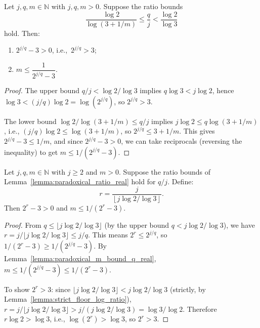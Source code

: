 \begin{lemma}\label{lemma:paradoxical_m_bound_q_real}\leanok
Let $j, q, m \in \mathbb{N}$ with $j, q, m > 0$. Suppose the ratio bounds
\begin{equation}
    \frac{\log 2}{\log(3 + 1/m)} \le \frac{q}{j} < \frac{\log 2}{\log 3}
\end{equation}
hold. Then:
\begin{enumerate}
    \item $2^{j/q} - 3 > 0$, i.e.,\  $2^{j/q} > 3$;
    \item $m \le \dfrac{1}{2^{j/q} - 3}$.
\end{enumerate}
\end{lemma}
\begin{proof}\leanok
The upper bound $q/j < \log 2 / \log 3$ implies $q \log 3 < j \log 2$, hence $\log 3 < (j/q) \log 2 = \log(2^{j/q})$, so $2^{j/q} > 3$.

The lower bound $\log 2 / \log(3+1/m) \le q/j$ implies $j \log 2 \le q \log(3+1/m)$, i.e., $(j/q)\log 2 \le \log(3+1/m)$, so $2^{j/q} \le 3 + 1/m$. This gives $2^{j/q} - 3 \le 1/m$, and since $2^{j/q} - 3 > 0$, we can take reciprocals (reversing the inequality) to get $m \le 1/(2^{j/q} - 3)$.
\end{proof}

\begin{lemma}\label{lemma:paradoxical_m_bound_floor_real}\leanok
Let $j, q, m \in \mathbb{N}$ with $j \ge 2$ and $m > 0$. Suppose the ratio bounds of Lemma~\ref{lemma:paradoxical_ratio_real} hold for $q/j$. Define:
\begin{equation}
    r = \frac{j}{\left\lfloor j \log 2 / \log 3 \right\rfloor}.
\end{equation}
Then $2^r - 3 > 0$ and $m \le 1/(2^r - 3)$.
\end{lemma}
\begin{proof}\leanok
From $q \le \lfloor j \log 2/\log 3 \rfloor$ (by the upper bound $q < j \log 2/\log 3$), we have $r = j/\lfloor j \log 2/\log 3 \rfloor \le j/q$.
This means $2^r \le 2^{j/q}$, so $1/(2^r - 3) \ge 1/(2^{j/q} - 3)$.
By Lemma~\ref{lemma:paradoxical_m_bound_q_real}, $m \le 1/(2^{j/q}-3) \le 1/(2^r - 3)$.

To show $2^r > 3$: since $\lfloor j\log 2/\log 3 \rfloor < j \log 2/\log 3$ (strictly, by Lemma~\ref{lemma:strict_floor_log_ratio}), $r = j/\lfloor j\log 2/\log 3 \rfloor > j/(j\log 2/\log 3) = \log 3/\log 2$.  Therefore $r \log 2 > \log 3$, i.e., $\log(2^r) > \log 3$, so $2^r > 3$.
\end{proof}

